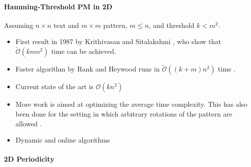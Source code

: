 \documentclass[11pt]{article}
\renewcommand{\O}{\mathcal{O}}
\newcommand{\tO}{\tilde{\mathcal{O}}}
\theoremstyle{plain}
\theoremstyle{definition}
\theoremstyle{remark}
\newcommand{\jonas}[2][]{\todo[color=green!40, #1]{\textbf{J:} #2}}
\begin{document}
\paragraph{Hamming-Threshold PM in 2D} Assuming $n \times n$ text and $m \times m$ pattern, $m \leq n$, and threshold $k < m^2$.

\begin{itemize}
	\item First result in 1987 by Krithivasan and Sitalakshmi \cite{Krithivasan1987}, who show that $\tO(kmn^2)$ time can be achieved.
	\item Faster algorithm by Rank and Heywood runs in $\tO((k+m)n^2)$ time \cite{Ranka1991}.
	\item Current state of the art\jonas{check} is $\O(kn^2)$ \cite{Amir1991}
	\item More work \cite{Baeza-Yates1998,Park1998,Kaerkkaeinen1999} is aimed at optimizing the average time complexity. This has also been done for the setting in which arbitrary rotations of the pattern are allowed \cite{Fredriksson2002}.
	\item Dynamic and online algorithms \cite{Clifford2016}
\end{itemize}

\paragraph{2D Periodicity}
\end{document}
